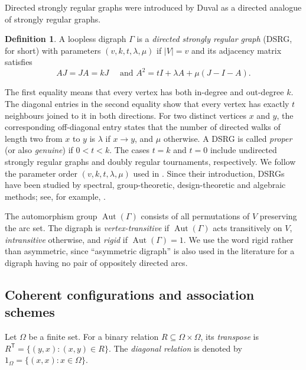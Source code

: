 \documentclass[11pt]{article}
\theoremstyle{definition}
\newtheorem{definition}[theorem]{Definition}
\theoremstyle{remark}
\DeclareMathOperator{\Aut}{Aut}
\begin{document}
Directed strongly regular graphs were introduced by Duval
\cite{du} as a directed analogue of strongly regular graphs.  

\begin{definition}
A loopless digraph $\Gamma$ is a \emph{directed strongly regular graph} 
(DSRG, for short) with parameters $(v,k,t,\lambda,\mu)$ if $|V|=v$ 
and its adjacency matrix satisfies
\[ AJ=JA=kJ\quad \text{ and }  A^2=tI+\lambda A+\mu(J-I-A).\]
\end{definition}

The first equality means that every vertex has both in-degree
and out-degree $k$.  The diagonal entries in the second equality show
that every vertex has exactly $t$ neighbours joined to it in both
directions.  For two distinct vertices $x$ and $y$, the corresponding
off-diagonal entry states that the number of directed walks of length
two from $x$ to $y$ is $\lambda$ if $x\to y$, and $\mu$ otherwise.
A DSRG is called \emph{proper} (or also \emph{genuine}) if $0<t<k$.
The cases $t=k$ and $t=0$ include undirected strongly regular graphs and
doubly regular tournaments, respectively.  We follow the parameter order
$(v,k,t,\lambda,\mu)$ used in \cite{du}.
 Since their introduction, DSRGs have been studied by spectral, group-theoretic, design-theoretic and algebraic methods; see, for example,
\cite{du,fkm,fkp,gh,gp,hs,jo,kmmz}.

The automorphism group $\Aut(\Gamma)$ consists of all permutations of $V$
preserving the arc set.  The digraph is \emph{vertex-transitive} if
$\Aut(\Gamma)$ acts transitively on $V$, \emph{intransitive} otherwise, and
\emph{rigid} if $\Aut(\Gamma)=1$.  We use the word rigid rather than
asymmetric, since ``asymmetric digraph'' is also used in the literature for a
digraph having no pair of oppositely directed arcs.

\subsection{Coherent configurations and association schemes}

Let $\Omega$ be a finite set.  For a binary relation
$R\subseteq\Omega\times\Omega$, its \emph{transpose} is
$ R^{\mathsf T}=\{(y,x):(x,y)\in R\}$.
The \emph{diagonal relation} is denoted by $1_{\Omega}=\{(x,x):x\in\Omega\}$.
\end{document}
